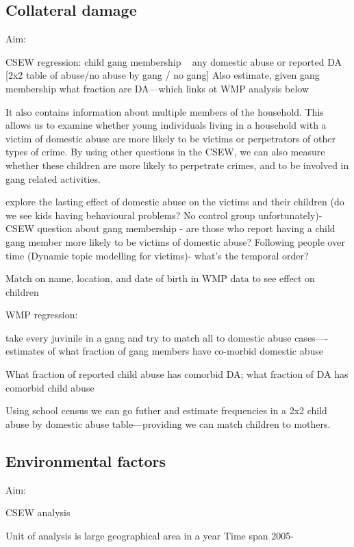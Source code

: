 \documentclass[11pt, a4paper]{article}
\begin{document}
\subsection{Collateral damage}

Aim:

CSEW regression: child gang membership ~ any domestic abuse or reported DA [2x2 table of abuse/no abuse by gang / no gang]
Also estimate, given gang membership what fraction are DA---which links ot WMP analysis below

It also contains information about  multiple members of the household. This allows us to examine whether young individuals living in a household with a victim of domestic abuse are more likely to be victims or perpetrators of other types of crime. By using other questions in the CSEW, we can also measure whether these children are more likely to perpetrate crimes, and to be involved in gang related activities.
 
 explore the lasting effect of domestic abuse on the victims and their children (do we see kids having behavioural problems? No control group unfortunately)- CSEW question about gang membership - are those who report having a child gang member more likely to be victims of domestic abuse? Following people over time (Dynamic topic modelling for victims)- what’s the temporal order? 

Match on name, location, and date of birth in WMP data to see effect on children

WMP regression:

take every juvinile in a gang and try to match all to domestic abuse cases----estimates of what fraction of gang members have co-morbid domestic abuse

What fraction of reported child abuse has comorbid DA; what fraction of DA has comorbid child abuse

Using school census we can go futher and estimate frequencies in a 2x2 child abuse  by domestic abuse table---providing we can match children to mothers.





\subsection{Environmental factors}


Aim:

CSEW analysis

Unit of analysis is large geographical area in a year 
Time span 2005-
\end{document}
